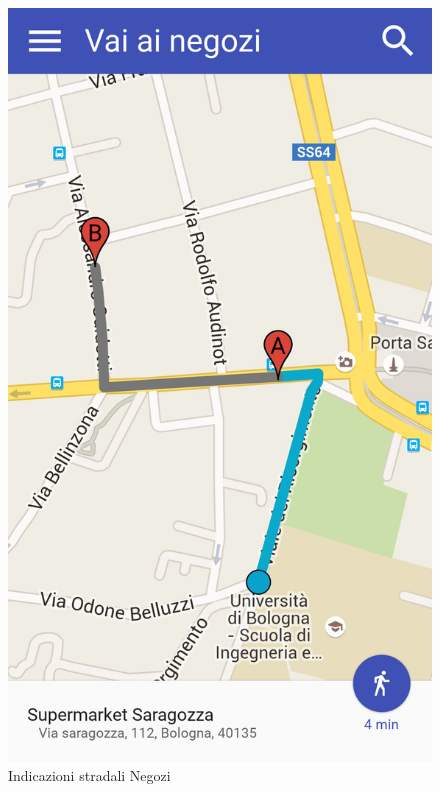 \begin{figure}[H]
\begin{minipage}{.49\textwidth}
		\includegraphics[width=\textwidth]{img/wireframe/mappa.png}
		\caption{Indicazioni stradali Negozi}
		\label{fig:indicazioni_stradali}
	\end{minipage}
\end{figure}	
